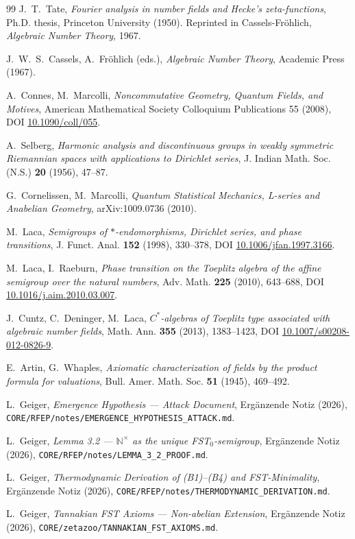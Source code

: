 \documentclass[11pt,a4paper]{article}
\theoremstyle{plain}
\theoremstyle{definition}
\newcommand{\N}{\mathbb{N}}
\begin{document}
\begin{thebibliography}{99}
J.~T.~Tate,
\textit{Fourier analysis in number fields and Hecke's
zeta-functions},
Ph.D. thesis, Princeton University (1950). Reprinted in
Cassels-Fr\"ohlich, \emph{Algebraic Number Theory}, 1967.

J.~W.~S.~Cassels, A.~Fr\"ohlich (eds.),
\textit{Algebraic Number Theory},
Academic Press (1967).

A.~Connes, M.~Marcolli,
\textit{Noncommutative Geometry, Quantum Fields, and Motives},
American Mathematical Society Colloquium Publications 55 (2008),
DOI \href{https://doi.org/10.1090/coll/055}{10.1090/coll/055}.

A.~Selberg,
\textit{Harmonic analysis and discontinuous groups in weakly
symmetric Riemannian spaces with applications to Dirichlet series},
J. Indian Math. Soc. (N.S.) \textbf{20} (1956), 47--87.

G.~Cornelissen, M.~Marcolli,
\textit{Quantum Statistical Mechanics, L-series and Anabelian Geometry},
arXiv:1009.0736 (2010).

M.~Laca,
\textit{Semigroups of $\ast$-endomorphisms, Dirichlet series, and
phase transitions},
J. Funct. Anal. \textbf{152} (1998), 330--378,
DOI \href{https://doi.org/10.1006/jfan.1997.3166}{10.1006/jfan.1997.3166}.

M.~Laca, I.~Raeburn,
\textit{Phase transition on the Toeplitz algebra of the affine
semigroup over the natural numbers},
Adv. Math. \textbf{225} (2010), 643--688,
DOI \href{https://doi.org/10.1016/j.aim.2010.03.007}{10.1016/j.aim.2010.03.007}.

J.~Cuntz, C.~Deninger, M.~Laca,
\textit{$C^\ast$-algebras of Toeplitz type associated with
algebraic number fields},
Math. Ann. \textbf{355} (2013), 1383--1423,
DOI \href{https://doi.org/10.1007/s00208-012-0826-9}{10.1007/s00208-012-0826-9}.

E.~Artin, G.~Whaples,
\textit{Axiomatic characterization of fields by the product formula
for valuations},
Bull. Amer. Math. Soc. \textbf{51} (1945), 469--492.

L.~Geiger,
\textit{Emergence Hypothesis --- Attack Document},
Ergänzende Notiz (2026),
\texttt{CORE/RFEP/notes/EMERGENCE\_HYPOTHESIS\_ATTACK.md}.

L.~Geiger,
\textit{Lemma 3.2 --- $\N^\times$ as the unique FST$_0$-semigroup},
Ergänzende Notiz (2026),
\texttt{CORE/RFEP/notes/LEMMA\_3\_2\_PROOF.md}.

L.~Geiger,
\textit{Thermodynamic Derivation of (B1)--(B4) and FST-Minimality},
Ergänzende Notiz (2026),
\texttt{CORE/RFEP/notes/THERMODYNAMIC\_DERIVATION.md}.

L.~Geiger,
\textit{Tannakian FST Axioms --- Non-abelian Extension},
Ergänzende Notiz (2026),
\texttt{CORE/zetazoo/TANNAKIAN\_FST\_AXIOMS.md}.

\end{thebibliography}
\end{document}
